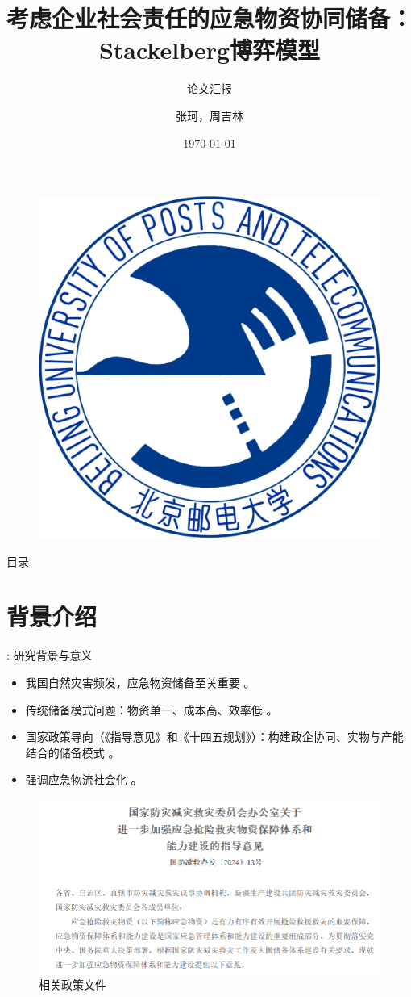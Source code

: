 \documentclass[9pt]{beamer}
\author{张珂，周吉林}
\title{考虑企业社会责任的应急物资协同储备：Stackelberg博弈模型}
\subtitle{论文汇报}
\institute{北京邮电大学 智能工程与自动化学院}
\date{\today}
\begin{document}
\kaishu
\begin{frame}
    \titlepage
    \begin{figure}[htpb]
        \begin{center}
            \vspace*{-0.5cm}
            \includegraphics[width=0.18\linewidth]{basic_pictures/bupt.jpg}
        \end{center}
    \end{figure}
\end{frame}

\begin{frame}{目录}
\tableofcontents[sectionstyle=show,subsectionstyle=show/shaded/hide,subsubsectionstyle=show/shaded/hide]
\end{frame}

\section{背景介绍}
\begin{frame}{\insertsectionhead: 研究背景与意义}
    \begin{itemize}
        \item 我国自然灾害频发，应急物资储备至关重要 \cite{MEM2024disaster, chen2009modern}。
        \item 传统储备模式问题：物资单一、成本高、效率低 \cite{chen2014突发事件灾前应急物资政企联合储备模式, wang2023防汛物资}。
        \item 国家政策导向（《指导意见》和《十四五规划》）：构建政企协同、实物与产能结合的储备模式 \cite{ndrc2022, sfdrrmc2024}。
        \item 强调应急物流社会化 \cite{lu2009应急物资储备的社会化研究}。
    \end{itemize}
    \begin{figure}
        \centering
        \includegraphics[width=0.8\linewidth]{basic_pictures/政府文件.png}
        \caption{相关政策文件}
        \label{fig:beamer_policy_guidance}
    \end{figure}
\end{frame}
\end{document}
